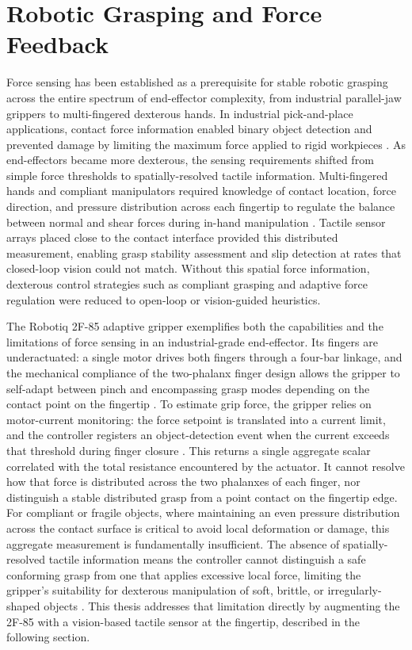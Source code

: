 \documentclass[12pt, a4paper]{report}
\begin{document}
\section{Robotic Grasping and Force Feedback}
Force sensing has been established as a prerequisite for stable robotic grasping across the entire spectrum of end-effector complexity, from industrial parallel-jaw grippers to multi-fingered dexterous hands. In industrial pick-and-place applications, contact force information enabled binary object detection and prevented damage by limiting the maximum force applied to rigid workpieces \cite{dahiya2010}. As end-effectors became more dexterous, the sensing requirements shifted from simple force thresholds to spatially-resolved tactile information. Multi-fingered hands and compliant manipulators required knowledge of contact location, force direction, and pressure distribution across each fingertip to regulate the balance between normal and shear forces during in-hand manipulation \cite{dahiya2010}. Tactile sensor arrays placed close to the contact interface provided this distributed measurement, enabling grasp stability assessment and slip detection at rates that closed-loop vision could not match. Without this spatial force information, dexterous control strategies such as compliant grasping and adaptive force regulation were reduced to open-loop or vision-guided heuristics.

The Robotiq 2F-85 adaptive gripper exemplifies both the capabilities and the limitations of force sensing in an industrial-grade end-effector. Its fingers are underactuated: a single motor drives both fingers through a four-bar linkage, and the mechanical compliance of the two-phalanx finger design allows the gripper to self-adapt between pinch and encompassing grasp modes depending on the contact point on the fingertip \cite{robotiq_manual}. To estimate grip force, the gripper relies on motor-current monitoring: the force setpoint is translated into a current limit, and the controller registers an object-detection event when the current exceeds that threshold during finger closure \cite{robotiq_manual}. This returns a single aggregate scalar correlated with the total resistance encountered by the actuator. It cannot resolve how that force is distributed across the two phalanxes of each finger, nor distinguish a stable distributed grasp from a point contact on the fingertip edge. For compliant or fragile objects, where maintaining an even pressure distribution across the contact surface is critical to avoid local deformation or damage, this aggregate measurement is fundamentally insufficient. The absence of spatially-resolved tactile information means the controller cannot distinguish a safe conforming grasp from one that applies excessive local force, limiting the gripper's suitability for dexterous manipulation of soft, brittle, or irregularly-shaped objects \cite{dahiya2010}. This thesis addresses that limitation directly by augmenting the 2F-85 with a vision-based tactile sensor at the fingertip, described in the following section.
\end{document}
